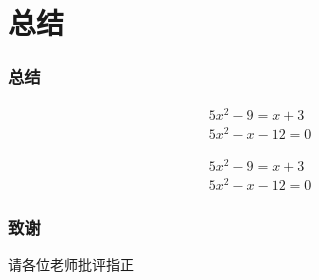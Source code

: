 \documentclass{beamer}%
\begin{document}
    \section{总结}
	\begin{frame}
		\frametitle{总结}	
		
		\begin{align}
			5x^2-9=x+3\\
			5x^2-x-12=0
		\end{align}
		
		
		\begin{align}
			5x^2-9=x+3\\
			5x^2-x-12=0
		\end{align}
	\end{frame}

	
	
	
	\begin{frame}
		\frametitle{ \kaishu\textbf{ 致谢}}
		\centerline{\Huge \youyuan 请各位老师批评指正}
	\end{frame}
	
	
	
\end{document}
